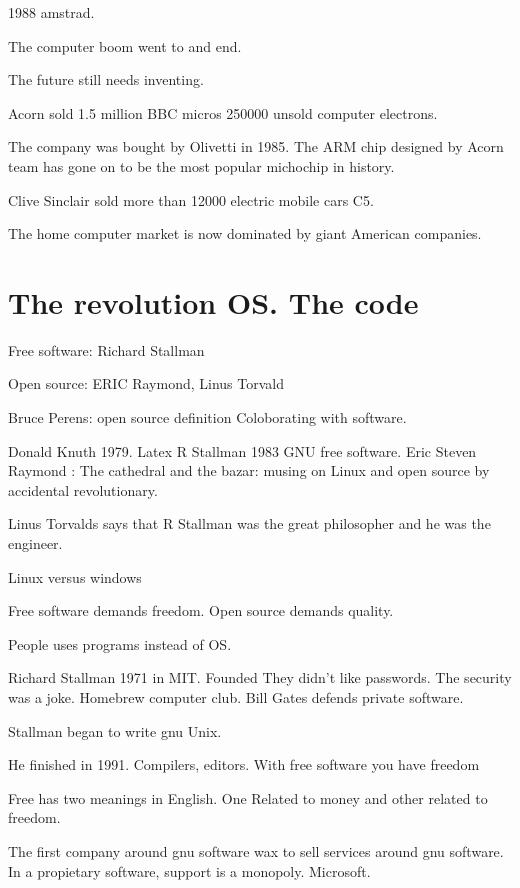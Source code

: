    1988 amstrad. 
   
   The computer boom went to and end. 
   
   The future still needs inventing. 
   
   Acorn sold 1.5 million BBC micros 
   250000 unsold computer electrons. 
   
   The company was bought by Olivetti in 1985. 
   The ARM chip designed by Acorn team has gone on to be the most popular michochip in history. 
   
   Clive Sinclair sold more than 12000 electric mobile cars C5. 
   
   The home computer market is now dominated by giant American companies. 
   
   
  
  \section{The revolution OS. The code}
  Free software: Richard Stallman 
  
  Open source: ERIC Raymond, Linus Torvald 
  
  
  Bruce Perens: open source definition 
  Coloborating with software. 
  
  Donald Knuth 1979. Latex 
  R Stallman 1983 GNU free software. 
  Eric Steven Raymond : The cathedral and the bazar: musing on Linux and open source by accidental revolutionary. 
  
  Linus Torvalds says that R Stallman was the great philosopher and he was the engineer. 
  
  
  
  
  
  Linux versus windows
  
  
  Free software demands freedom. 
  Open source demands quality. 
  
  People uses programs instead of OS. 
  
  Richard Stallman 
  1971 in MIT. Founded 
  They didn't like passwords. 
  The security was a joke. 
  Homebrew computer club. 
  Bill Gates defends private software. 
  
  Stallman  began to write gnu Unix. 
  
  He finished in 1991. 
  Compilers, editors. 
  With free software you have freedom 
  
  Free has two meanings in English. One 
  Related to money and other related to freedom. 
  
  
  The first company around gnu software wax to sell services around gnu software. In a propietary software, support is a monopoly. Microsoft. 
  
